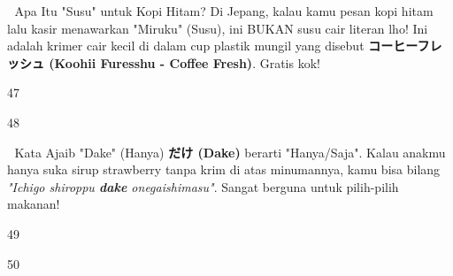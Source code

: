 \begin{lessonbox}{🍯 Apa Itu "Susu" untuk Kopi Hitam?}
    Di Jepang, kalau kamu pesan kopi hitam lalu kasir menawarkan "Miruku" (Susu), ini BUKAN susu cair literan lho! Ini adalah krimer cair kecil di dalam cup plastik mungil yang disebut \textbf{コーヒーフレッシュ (Koohii Furesshu - Coffee Fresh)}. Gratis kok!
\end{lessonbox}

\begin{convobox}{47}
    \noindent
     

    \vspace{1.5em}
\end{convobox}

\begin{convobox}{48}
    \noindent
      

    \vspace{1.5em}
\end{convobox}

\begin{lessonbox}{💎 Kata Ajaib "Dake" (Hanya)}
    \textbf{だけ (Dake)} berarti "Hanya/Saja". Kalau anakmu hanya suka sirup strawberry tanpa krim di atas minumannya, kamu bisa bilang \textit{"Ichigo shiroppu \textbf{dake} onegaishimasu"}. Sangat berguna untuk pilih-pilih makanan!
\end{lessonbox}

\begin{convobox}{49}
    \noindent
     

    \vspace{1.5em}
\end{convobox}

\begin{convobox}{50}
    \noindent
      

    \vspace{1.5em}
\end{convobox}

